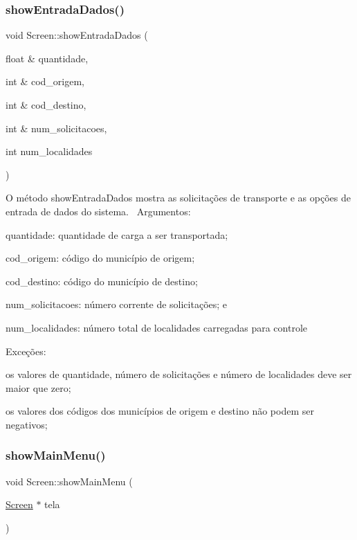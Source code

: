 \subsubsection{\texorpdfstring{show\+Entrada\+Dados()}{showEntradaDados()}}
{\footnotesize\ttfamily void Screen\+::show\+Entrada\+Dados (\begin{DoxyParamCaption}\item[{float \&}]{quantidade,  }\item[{int \&}]{cod\+\_\+origem,  }\item[{int \&}]{cod\+\_\+destino,  }\item[{int \&}]{num\+\_\+solicitacoes,  }\item[{int}]{num\+\_\+localidades }\end{DoxyParamCaption})}

O método show\+Entrada\+Dados mostra as solicitações de transporte e as opções de entrada de dados do sistema.~\newline
Argumentos\+:
\begin{DoxyItemize}
\item quantidade\+: quantidade de carga a ser transportada;
\item cod\+\_\+origem\+: código do município de origem;
\item cod\+\_\+destino\+: código do município de destino;
\item num\+\_\+solicitacoes\+: número corrente de solicitações; e
\item num\+\_\+localidades\+: número total de localidades carregadas para controle
\end{DoxyItemize}

Exceções\+:
\begin{DoxyItemize}
\item os valores de quantidade, número de solicitações e número de localidades deve ser maior que zero;
\item os valores dos códigos dos municípios de origem e destino não podem ser negativos;
\end{DoxyItemize}\mbox{\label{classScreen_a3ea61b376ace3fa90b16ba31b01a8107}} 
\subsubsection{\texorpdfstring{show\+Main\+Menu()}{showMainMenu()}}
{\footnotesize\ttfamily void Screen\+::show\+Main\+Menu (\begin{DoxyParamCaption}\item[{\hyperlink{classScreen}{Screen} $\ast$}]{tela }\end{DoxyParamCaption})}

